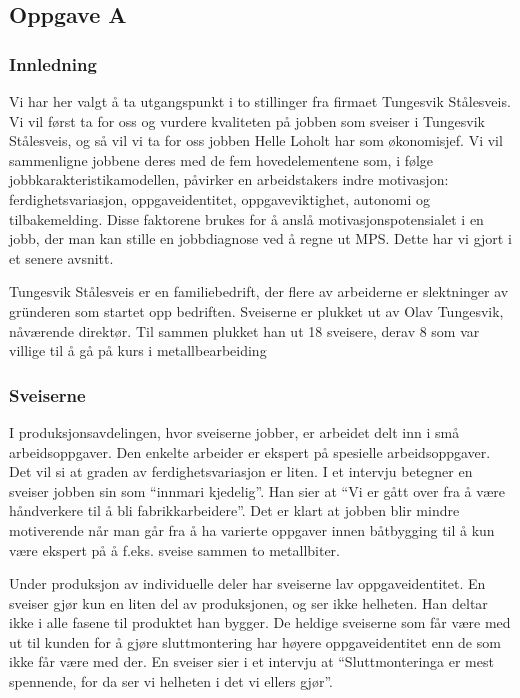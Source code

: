 

\subsection{Oppgave A}
\subsubsection{Innledning}
Vi har her valgt å ta utgangspunkt i to stillinger fra firmaet Tungesvik Stålesveis. Vi vil først ta for oss og vurdere kvaliteten på jobben som sveiser i Tungesvik Stålesveis, og så vil vi ta for oss jobben Helle Loholt har som økonomisjef. Vi vil sammenligne jobbene deres med de fem hovedelementene som, i følge jobbkarakteristikamodellen, påvirker en arbeidstakers indre motivasjon: ferdighetsvariasjon, oppgaveidentitet, oppgaveviktighet, autonomi og tilbakemelding. Disse faktorene brukes for å anslå motivasjonspotensialet i en jobb, der man kan stille en jobbdiagnose ved å regne ut MPS. Dette har vi gjort i et senere avsnitt.

Tungesvik Stålesveis er en familiebedrift, der flere av arbeiderne er slektninger av gründeren som startet opp bedriften. Sveiserne er plukket ut av Olav Tungesvik, nåværende direktør. Til sammen plukket han ut 18 sveisere, derav 8 som var villige til å gå på kurs i metallbearbeiding

\subsubsection{Sveiserne}
I produksjonsavdelingen, hvor sveiserne jobber, er arbeidet delt inn i små arbeidsoppgaver. Den enkelte arbeider er ekspert på spesielle arbeidsoppgaver. Det vil si at graden av ferdighetsvariasjon er liten. I et intervju betegner en sveiser jobben sin som “innmari kjedelig”. Han sier at “Vi er gått over fra å være håndverkere til å bli fabrikkarbeidere”. Det er klart at jobben blir mindre motiverende når man går fra å ha varierte oppgaver innen båtbygging til å kun være ekspert på å f.eks. sveise sammen to metallbiter.

Under produksjon av individuelle deler har sveiserne lav oppgaveidentitet. En sveiser gjør kun en liten del av produksjonen, og ser ikke helheten. Han deltar ikke i alle fasene til produktet han bygger. De heldige sveiserne som får være med ut til kunden for å gjøre sluttmontering har høyere oppgaveidentitet enn de som ikke får være med der. En sveiser sier i et intervju at “Sluttmonteringa er mest spennende, for da ser vi helheten i det vi ellers gjør”.

